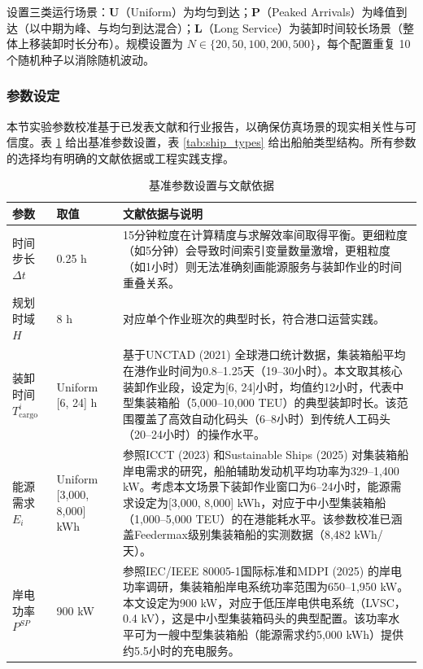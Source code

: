 \documentclass[UTF8, a4paper, 12pt]{ctexart}
\begin{document}
设置三类运行场景：\textbf{U}（Uniform）为均匀到达；\textbf{P}（Peaked Arrivals）为峰值到达（以中期为峰、与均匀到达混合）；\textbf{L}（Long Service）为装卸时间较长场景（整体上移装卸时长分布）。规模设置为 $N\in\{20,50,100,200,500\}$，每个配置重复 10 个随机种子以消除随机波动。

\subsubsection{参数设定}
\label{sec:parameter_setting}

本节实验参数校准基于已发表文献和行业报告，以确保仿真场景的现实相关性与可信度。表 \ref{tab:exp_params} 给出基准参数设置，表 \ref{tab:ship_types} 给出船舶类型结构。所有参数的选择均有明确的文献依据或工程实践支撑。

\begin{table}[htbp]
    \centering
    \caption{基准参数设置与文献依据}
    \label{tab:exp_params}
    \tiny
    \renewcommand{\arraystretch}{1.3}
    \begin{threeparttable}
    \begin{tabular}{p{3.2cm} p{2cm} p{9cm}}
        \toprule
        \textbf{参数} & \textbf{取值} & \textbf{文献依据与说明} \\
        \midrule
        时间步长 $\Delta t$ & 0.25 h & 15分钟粒度在计算精度与求解效率间取得平衡。更细粒度（如5分钟）会导致时间索引变量数量激增，更粗粒度（如1小时）则无法准确刻画能源服务与装卸作业的时间重叠关系。 \\
        \addlinespace
        规划时域 $H$ & 8 h & 对应单个作业班次的典型时长，符合港口运营实践。 \\
        \addlinespace
        装卸时间 $T_{\text{cargo}}^i$ & Uniform [6, 24] h & 基于UNCTAD (2021) \cite{UNCTAD2021}全球港口统计数据，集装箱船平均在港作业时间为0.8--1.25天（19--30小时）。本文取其核心装卸作业段，设定为[6, 24]小时，均值约12小时，代表中型集装箱船（5,000--10,000 TEU）的典型装卸时长。该范围覆盖了高效自动化码头（6--8小时）到传统人工码头（20--24小时）的操作水平。 \\
        \addlinespace
        能源需求 $E_i$ & Uniform [3,000, 8,000] kWh & 参照ICCT (2023) \cite{ICCT2023}和Sustainable Ships (2025) \cite{SustainableShips2025}对集装箱船岸电需求的研究，船舶辅助发动机平均功率为329--1,400 kW。考虑本文场景下装卸作业窗口为6--24小时，能源需求设定为[3,000, 8,000] kWh，对应于中小型集装箱船（1,000--5,000 TEU）的在港能耗水平。该参数校准已涵盖Feedermax级别集装箱船的实测数据（8,482 kWh/天）。 \\
        \addlinespace
        岸电功率 $P^{SP}$ & 900 kW & 参照IEC/IEEE 80005-1国际标准\cite{IEC80005}和MDPI (2025) \cite{MDPI2025}的岸电功率调研，集装箱船岸电系统功率范围为650--1,950 kW。本文设定为900 kW，对应于低压岸电供电系统（LVSC，0.4 kV），这是中小型集装箱码头的典型配置。该功率水平可为一艘中型集装箱船（能源需求约5,000 kWh）提供约5.5小时的充电服务。 \\

\end{tabular}
\end{threeparttable}
\end{table}
\end{document}
